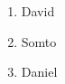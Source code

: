 \documentclass{article}
\begin{document}
	
	\begin{enumerate}
		\item David
		\item Somto
		\item Daniel
	\end{enumerate}
\end{document}
